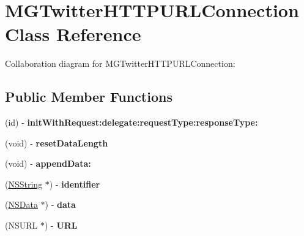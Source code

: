 \hypertarget{interface_m_g_twitter_h_t_t_p_u_r_l_connection}{
\section{\-M\-G\-Twitter\-H\-T\-T\-P\-U\-R\-L\-Connection \-Class \-Reference}
\label{interface_m_g_twitter_h_t_t_p_u_r_l_connection}
}


\-Collaboration diagram for \-M\-G\-Twitter\-H\-T\-T\-P\-U\-R\-L\-Connection\-:
\subsection*{\-Public \-Member \-Functions}
\begin{DoxyCompactItemize}
\item 
\hypertarget{interface_m_g_twitter_h_t_t_p_u_r_l_connection_ae9f49aec475cdb37ba4d7b13b714676e}{
(id) -\/ {\bfseries init\-With\-Request\-:delegate\-:request\-Type\-:response\-Type\-:}}
\label{interface_m_g_twitter_h_t_t_p_u_r_l_connection_ae9f49aec475cdb37ba4d7b13b714676e}

\item 
\hypertarget{interface_m_g_twitter_h_t_t_p_u_r_l_connection_aab2b67bae8793a2b01722e0247874251}{
(void) -\/ {\bfseries reset\-Data\-Length}}
\label{interface_m_g_twitter_h_t_t_p_u_r_l_connection_aab2b67bae8793a2b01722e0247874251}

\item 
\hypertarget{interface_m_g_twitter_h_t_t_p_u_r_l_connection_a9e6f7ee990f377401643e299704767f7}{
(void) -\/ {\bfseries append\-Data\-:}}
\label{interface_m_g_twitter_h_t_t_p_u_r_l_connection_a9e6f7ee990f377401643e299704767f7}

\item 
\hypertarget{interface_m_g_twitter_h_t_t_p_u_r_l_connection_a4fc426b6d9956d3ddeb4cfb434021ed8}{
(\hyperlink{class_n_s_string}{\-N\-S\-String} $\ast$) -\/ {\bfseries identifier}}
\label{interface_m_g_twitter_h_t_t_p_u_r_l_connection_a4fc426b6d9956d3ddeb4cfb434021ed8}

\item 
\hypertarget{interface_m_g_twitter_h_t_t_p_u_r_l_connection_aa6bf8a3f759ac8b2f67773eb2002691f}{
(\hyperlink{class_n_s_data}{\-N\-S\-Data} $\ast$) -\/ {\bfseries data}}
\label{interface_m_g_twitter_h_t_t_p_u_r_l_connection_aa6bf8a3f759ac8b2f67773eb2002691f}

\item 
\hypertarget{interface_m_g_twitter_h_t_t_p_u_r_l_connection_a0ff79a129c0adc8da817b6b675e589db}{
(\-N\-S\-U\-R\-L $\ast$) -\/ {\bfseries \-U\-R\-L}}
\label{interface_m_g_twitter_h_t_t_p_u_r_l_connection_a0ff79a129c0adc8da817b6b675e589db}


\end{DoxyCompactItemize}
